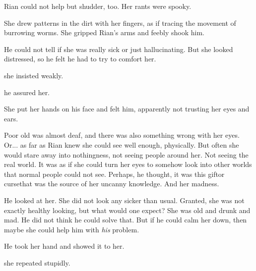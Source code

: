 Rian could not help but shudder, too. 
Her rants were spooky. 

She drew patterns in the dirt with her fingers, as if tracing the movement of burrowing worms. 
She gripped Rian's arms and feebly shook him.

He could not tell if she was really sick or just hallucinating. 
But she looked distressed, so he felt he had to try to comfort her. 

she insisted weakly. 

he assured her. 

She put her hands on his face and felt him, apparently not trusting her eyes and ears. 

Poor old \Uswa{} was almost deaf, and there was also something wrong with her eyes. 
Or... as far as Rian knew she could see well enough, physically. 
But often she would stare away into nothingness, not seeing people around her. 
Not seeing the real world. 
It was as if she could turn her eyes to somehow look into other worlds that normal people could not see. 
Perhaps, he thought, it was this gift\dash or curse\dash that was the source of her uncanny knowledge. 
And her madness. 

He looked at her. 
She did not look any sicker than usual. 
Granted, she was not exactly healthy looking, but what would one expect?
She was old and drunk and mad. 
He did not think he could solve that. 
But if he could calm her down, then maybe she could help him with \emph{his} problem. 


He took her hand and showed it to her. 

 she repeated stupidly. 

